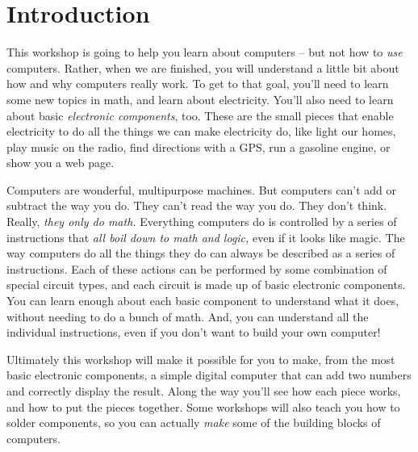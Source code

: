 \section{Introduction}

This workshop is going to help you learn about computers -- but not how to \emph{use} computers. Rather, when we are finished, you will understand a little bit about how and why computers really work. To get to that goal, you'll need to learn some new topics in math, and learn about electricity. You'll also need to learn about basic \emph{electronic components}, too. These are the small pieces that enable electricity to do all the things we can make electricity do, like light our homes, play music on the radio, find directions with a GPS, run a gasoline engine, or show you a web page.

Computers are wonderful, multipurpose machines. But computers can't add or subtract the way you do. They can't read the way you do. They don't think. Really,  \emph{they only do math.} Everything computers do is controlled by a series of instructions that \emph{all boil down to math and logic,} even if it looks like magic. The way computers do all the things they do can always be described as a  series of instructions. Each of these actions can be performed by some combination of special circuit types, and each circuit is made up of basic electronic components. You can learn enough about each basic component to understand what it does, without needing to do a bunch of math. And, you can understand all the individual instructions, even if you don't want to build your own computer!

Ultimately this workshop will make it possible for you to make, from the most basic electronic components, a simple digital computer that can add two numbers and correctly display the result. Along the way you'll see how each piece works, and how to put the pieces together. Some workshops will also teach you how to solder components, so you can actually \emph{make} some of the building blocks of computers. 

